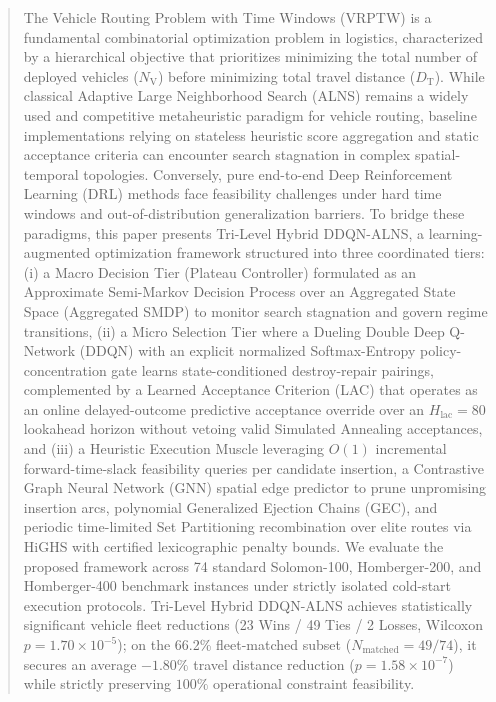\documentclass{ieeeaccess}
\newcommand{\NV}{{N_\mathrm{V}}}
\newcommand{\TD}{{D_\mathrm{T}}}
\begin{document}
\newlength{\realabstractwidth}
\setlength{\realabstractwidth}{\titlewidth}
\addtolength{\realabstractwidth}{-9.27pt}
\let\abstractwidth\realabstractwidth
\begin{abstract}
The Vehicle Routing Problem with Time Windows (VRPTW) is a fundamental combinatorial optimization problem in logistics, characterized by a hierarchical objective that prioritizes minimizing the total number of deployed vehicles ($\NV$) before minimizing total travel distance ($\TD$). While classical Adaptive Large Neighborhood Search (ALNS) remains a widely used and competitive metaheuristic paradigm for vehicle routing, baseline implementations relying on stateless heuristic score aggregation and static acceptance criteria can encounter search stagnation in complex spatial-temporal topologies. Conversely, pure end-to-end Deep Reinforcement Learning (DRL) methods face feasibility challenges under hard time windows and out-of-distribution generalization barriers. To bridge these paradigms, this paper presents Tri-Level Hybrid DDQN-ALNS, a learning-augmented optimization framework structured into three coordinated tiers: (i) a Macro Decision Tier (Plateau Controller) formulated as an Approximate Semi-Markov Decision Process over an Aggregated State Space (Aggregated SMDP) to monitor search stagnation and govern regime transitions, (ii) a Micro Selection Tier where a Dueling Double Deep Q-Network (DDQN) with an explicit normalized Softmax-Entropy policy-concentration gate learns state-conditioned destroy-repair pairings, complemented by a Learned Acceptance Criterion (LAC) that operates as an online delayed-outcome predictive acceptance override over an $H_{\text{lac}}=80$ lookahead horizon without vetoing valid Simulated Annealing acceptances, and (iii) a Heuristic Execution Muscle leveraging $O(1)$ incremental forward-time-slack feasibility queries per candidate insertion, a Contrastive Graph Neural Network (GNN) spatial edge predictor to prune unpromising insertion arcs, polynomial Generalized Ejection Chains (GEC), and periodic time-limited Set Partitioning recombination over elite routes via HiGHS with certified lexicographic penalty bounds. We evaluate the proposed framework across 74 standard Solomon-100, Homberger-200, and Homberger-400 benchmark instances under strictly isolated cold-start execution protocols. Tri-Level Hybrid DDQN-ALNS achieves statistically significant vehicle fleet reductions (23 Wins / 49 Ties / 2 Losses, Wilcoxon $p=1.70 \times 10^{-5}$); on the 66.2\% fleet-matched subset ($N_{\text{matched}}=49/74$), it secures an average $-1.80\%$ travel distance reduction ($p=1.58 \times 10^{-7}$) while strictly preserving $100\%$ operational constraint feasibility.
\end{abstract}
\end{document}
